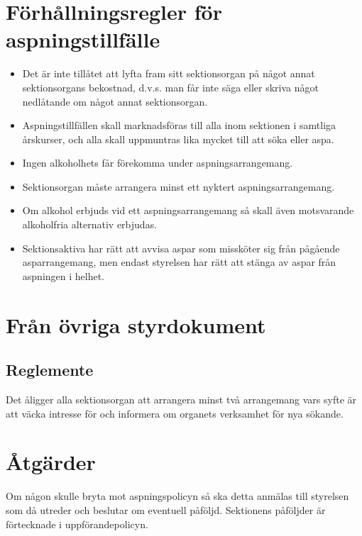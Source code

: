 \documentclass[11pt, includeaddress]{classes/cthit}
\begin{document}
\section{Förhållningsregler för aspningstillfälle}

\begin{itemize}
  \item Det är inte tillåtet att lyfta fram sitt sektionsorgan på något annat sektionsorgans bekostnad, d.v.s. man får inte säga eller skriva något nedlåtande om något annat sektionsorgan.
  \item Aspningstillfällen skall marknadsföras till alla inom sektionen i samtliga årskurser, och
  alla skall uppmuntras lika mycket till att söka eller aspa.
  \item Ingen alkoholhets får förekomma under aspningsarrangemang. 
  \item Sektionsorgan måste arrangera minst ett nyktert aspningsarrangemang.
  \item Om alkohol erbjuds vid ett aspningsarrangemang så skall även motsvarande alkoholfria alternativ erbjudas.
  \item Sektionsaktiva har rätt att avvisa aspar som missköter sig från pågående asparrangemang, men endast styrelsen har rätt att stänga av aspar från aspningen i helhet. 
\end{itemize}

\section{Från övriga styrdokument}
\subsection{Reglemente}
Det åligger alla sektionsorgan att arrangera minst två arrangemang vars syfte är att
väcka intresse för och informera om organets verksamhet för nya sökande.

\section{Åtgärder}
Om någon skulle bryta mot aspningspolicyn så ska detta anmälas till styrelsen som då utreder och beslutar om eventuell påföljd.
Sektionens påföljder är förtecknade i uppförandepolicyn. 
\end{document}
